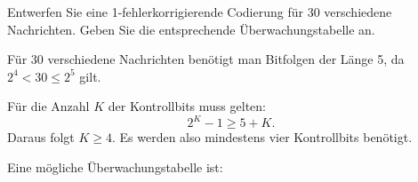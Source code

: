 \begin{mychallenge}

    Entwerfen Sie eine 1-fehlerkorrigierende Codierung für
    30 verschiedene Nachrichten. Geben Sie die entsprechende
    Überwachungstabelle an.
    \begin{myanswer}

        Für 30 verschiedene Nachrichten benötigt man Bitfolgen der Länge 5,
        da \(2^4 < 30 \leq 2^5\) gilt.

        Für die Anzahl \(K\) der Kontrollbits muss gelten:
        \[
            2^K-1 \geq 5+K.
        \]
        Daraus folgt \(K\geq 4\). Es werden also mindestens
        vier Kontrollbits benötigt.

        Eine mögliche Überwachungstabelle ist:

        \begin{center}
\end{center}
\end{myanswer}
\end{mychallenge}
